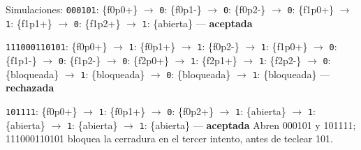 \documentclass[11pt]{article}
\begin{document}
Simulaciones: \texttt{000101}: \{f0p0+\} $\to$ \texttt{0}: \{f0p1-\} $\to$ \texttt{0}: \{f0p2-\} $\to$ \texttt{0}: \{f1p0+\} $\to$ \texttt{1}: \{f1p1+\} $\to$ \texttt{0}: \{f1p2+\} $\to$ \texttt{1}: \{abierta\} — \textbf{aceptada}\par \texttt{111000110101}: \{f0p0+\} $\to$ \texttt{1}: \{f0p1+\} $\to$ \texttt{1}: \{f0p2-\} $\to$ \texttt{1}: \{f1p0+\} $\to$ \texttt{0}: \{f1p1-\} $\to$ \texttt{0}: \{f1p2-\} $\to$ \texttt{0}: \{f2p0+\} $\to$ \texttt{1}: \{f2p1+\} $\to$ \texttt{1}: \{f2p2-\} $\to$ \texttt{0}: \{bloqueada\} $\to$ \texttt{1}: \{bloqueada\} $\to$ \texttt{0}: \{bloqueada\} $\to$ \texttt{1}: \{bloqueada\} — \textbf{rechazada}\par \texttt{101111}: \{f0p0+\} $\to$ \texttt{1}: \{f0p1+\} $\to$ \texttt{0}: \{f0p2+\} $\to$ \texttt{1}: \{abierta\} $\to$ \texttt{1}: \{abierta\} $\to$ \texttt{1}: \{abierta\} $\to$ \texttt{1}: \{abierta\} — \textbf{aceptada}
\resp Abren 000101 y 101111; 111000110101 bloquea la cerradura en el tercer intento, antes de teclear 101.
\end{document}
